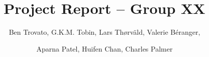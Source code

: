 \documentclass[sigconf,nonacm]{acmart}
\title{Project Report -- Group XX}
\author{Ben Trovato, G.K.M. Tobin, Lars Th{\o}rv{\"a}ld, Valerie B\'eranger,}
\author{Aparna Patel, Huifen Chan, Charles Palmer}
\begin{document}

\begin{abstract}

\end{abstract}

\maketitle







\end{document}
